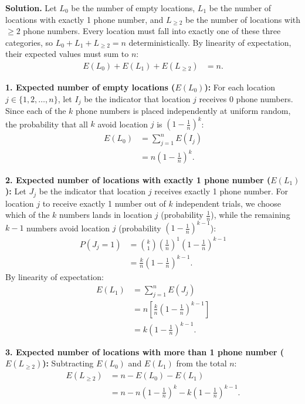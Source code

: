 \documentclass[11pt,a4paper]{article}
\begin{document}
\noindent \textbf{Solution.} Let $L_0$ be the number of empty locations, $L_1$ be the number of locations with exactly 1 phone number, and $L_{\ge 2}$ be the number of locations with $\ge 2$ phone numbers. Every location must fall into exactly one of these three categories, so $L_0 + L_1 + L_{\ge 2} = n$ deterministically. By linearity of expectation, their expected values must sum to $n$:
\begin{align*}
E(L_0) + E(L_1) + E(L_{\ge 2}) &= n.
\end{align*}

\vspace{4pt}
\noindent \textbf{1. Expected number of empty locations ($E(L_0)$):}
For each location $j \in \{1, 2, \dots, n\}$, let $I_j$ be the indicator that location $j$ receives 0 phone numbers. Since each of the $k$ phone numbers is placed independently at uniform random, the probability that all $k$ avoid location $j$ is $\left(1 - \frac{1}{n}\right)^k$:
\begin{align*}
E(L_0) &= \sum_{j=1}^{n} E(I_j) \\
&= n \left(1 - \frac{1}{n}\right)^k.
\end{align*}

\vspace{4pt}
\noindent \textbf{2. Expected number of locations with exactly 1 phone number ($E(L_1)$):}
Let $J_j$ be the indicator that location $j$ receives exactly 1 phone number. For location $j$ to receive exactly 1 number out of $k$ independent trials, we choose which of the $k$ numbers lands in location $j$ (probability $\frac{1}{n}$), while the remaining $k-1$ numbers avoid location $j$ (probability $\left(1 - \frac{1}{n}\right)^{k-1}$):
\begin{align*}
P(J_j = 1) &= \binom{k}{1} \left(\frac{1}{n}\right)^1 \left(1 - \frac{1}{n}\right)^{k-1} \\
&= \frac{k}{n} \left(1 - \frac{1}{n}\right)^{k-1}.
\end{align*}
By linearity of expectation:
\begin{align*}
E(L_1) &= \sum_{j=1}^{n} E(J_j) \\
&= n \left[ \frac{k}{n} \left(1 - \frac{1}{n}\right)^{k-1} \right] \\
&= k \left(1 - \frac{1}{n}\right)^{k-1}.
\end{align*}

\vspace{4pt}
\noindent \textbf{3. Expected number of locations with more than 1 phone number ($E(L_{\ge 2})$):}
Subtracting $E(L_0)$ and $E(L_1)$ from the total $n$:
\begin{align*}
E(L_{\ge 2}) &= n - E(L_0) - E(L_1) \\
&= n - n \left(1 - \frac{1}{n}\right)^k - k \left(1 - \frac{1}{n}\right)^{k-1}.
\end{align*}
\end{document}
